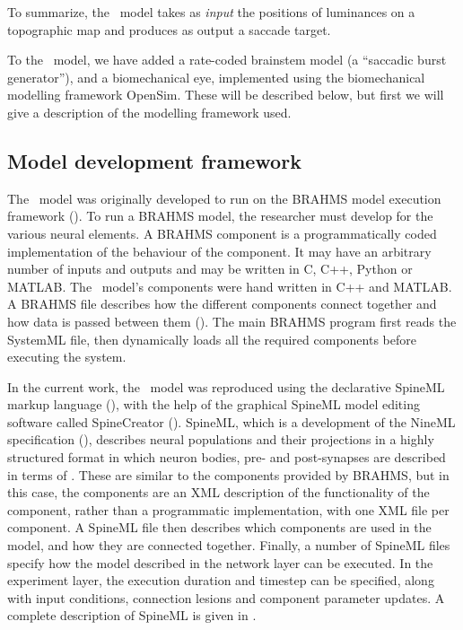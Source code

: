 \documentclass{frontiersSCNS}
\begin{document}
To summarize, the \ccg~model takes as \emph{input} the positions of luminances on a topographic map and produces as output a saccade target.

To the \ccg~model, we have added a rate-coded brainstem model (a ``saccadic burst
generator''), and a biomechanical eye, implemented using the biomechanical modelling framework OpenSim. These will be described below,
but first we will give a description of the modelling framework used.

\subsection{Model development framework}

The \ccg~model was originally developed to run on the BRAHMS model
execution framework
(). To run a
BRAHMS model, the researcher must develop  for
the various neural elements. A BRAHMS component is a programmatically
coded implementation of the behaviour of the component. It may have an
arbitrary number of inputs and outputs and may be written in C, C++,
Python or MATLAB. The \ccg~model's components were hand written in C++
and MATLAB. A BRAHMS  file describes how the different
components connect together and how data is passed between them
(). The main BRAHMS program first
reads the SystemML file, then dynamically loads all the required
components before executing the system.

In the current work, the \ccg~model was reproduced using the
declarative SpineML markup language (),
with the help of the graphical SpineML model editing software
called SpineCreator
(). SpineML,
which is a development of the NineML specification
(),
describes neural populations and their projections in a highly
structured format in which neuron bodies, pre- and post-synapses are
described in terms of . These are similar to the
components provided by BRAHMS, but in this case, the components are an
XML description of the functionality of the component, rather than a
programmatic implementation, with one XML file per component. A
SpineML  file then describes which components are
used in the model, and how they are connected together. Finally, a
number of SpineML  files specify how the model
described in the network layer can be executed. In the experiment
layer, the execution duration and timestep can be specified, along
with input conditions, connection lesions and component parameter
updates. A complete description of SpineML is given
in .
\end{document}
